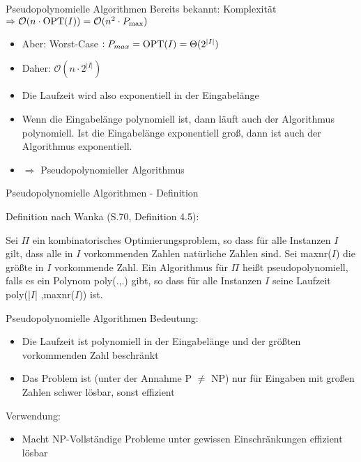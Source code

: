 \begin{frame}{Pseudopolynomielle Algorithmen}
Bereits bekannt: Komplexität $\Rightarrow \mathcal{O}( n \cdot \operatorname{OPT}(I)) = \mathcal{O}( n^2 \cdot P_{\max})$ 
\begin{itemize}
	\item
	Aber: Worst-Case $: P_{max} = \operatorname{OPT}(I) = \Theta(2^{|I|})$
	\item
	Daher: 
	$\mathcal{O}(n\cdot 2^{|I|})$
	\item
	Die Laufzeit wird also exponentiell in der Eingabelänge
	\item
	Wenn die Eingabelänge polynomiell ist, dann läuft auch der Algorithmus polynomiell. Ist die Eingabelänge exponentiell groß, dann ist auch der Algorithmus exponentiell.
	\item $\Rightarrow$ Pseudopolynomieller Algorithmus
\end{itemize}

\end{frame}

\begin{frame}{Pseudopolynomielle Algorithmen - Definition}

Definition nach Wanka (S.70, Definition 4.5): \newline

Sei $\Pi$ ein kombinatorisches Optimierungsproblem, so dass für alle Instanzen $I$ gilt, dass alle in $I$ vorkommenden Zahlen natürliche Zahlen sind. Sei maxnr($I$) die größte in $I$ vorkommende Zahl. Ein Algorithmus für $\Pi$ heißt pseudopolynomiell, falls es ein Polynom poly(.,.)  gibt, so 
dass für alle Instanzen $I$ seine Laufzeit poly(|$I$| ,maxnr($I$)) ist. 

\end{frame}
\begin{frame}{Pseudopolynomielle Algorithmen}
Bedeutung:

\begin{itemize}
	\item Die Laufzeit ist polynomiell in der Eingabelänge und der größten vorkommenden Zahl beschränkt
	\item Das Problem ist (unter der Annahme P $\neq$ NP) nur für Eingaben mit großen Zahlen schwer lösbar, sonst effizient
\end{itemize}

Verwendung:
\begin{itemize}
	\item Macht NP-Vollständige Probleme unter gewissen Einschränkungen effizient lösbar
\end{itemize}
\end{frame}

